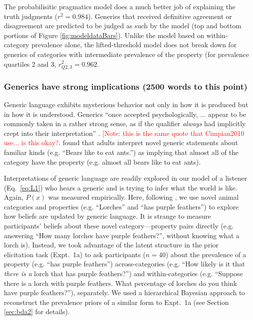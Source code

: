 \documentclass[10pt,letterpaper]{article}
\newcommand{\red}[1]{\textcolor{Red}{#1}}
\begin{document}
The probabilisitic pragmatics model does a much better job of explaining the truth judgments ($r^2=0.984$). 
Generics that received definitive agreement or disagreement are predicted to be judged as such by the model (top and bottom portions of Figure \ref{fig:modeldataBars}). Unlike the model based on within-category prevalence alone, the lifted-threshold model does not break down for generics of categories with intermediate prevalence of the property (for prevalence quartiles 2 and 3, $r_{Q2,3}^2=0.962$. 

\subsubsection{Generics have strong implications (2500 words to this point)} 

Generic language exhibits mysterious behavior not only in how it is produced but in how it is understood.
Generics ``once accepted psychologically, ... appear to be commonly taken in a rather strong sense, as if the qualifier \emph{always} had implicitly crept into their interpretation'' \cite{Abelson1966}. \red{[Note: this is the same quote that Cimpian2010 use... is this okay?}.
%
 found that adults interpret novel generic statements about familiar kinds (e.g. ``Bears like to eat ants.'') as implying that almost all of the category have the property (e.g. almost all bears like to eat ants).

Interpretations of generic language are readily explored in our model of a listener (Eq.~\ref{eq:L1}) who hears a generic and is trying to infer what the world is like. 
Again, $P(x)$ was measured empirically.
Here, following , we use novel animal categories and properties (e.g. ``Lorches'' and ``has purple feathers'') to explore how beliefs are updated by generic language. 
It is strange to measure participants' beliefs about these novel category---property pairs directly (e.g. answering ``How many lorches have purple feathers?'', without knowing what a lorch is).
Instead, we took advantage of the latent structure in the prior elicitation task (Expt.~1a) to ask participants ($n=40$) about the prevalence of a property (e.g. ``has purple feathers'') across-categories (e.g. ``How likely is it that \emph{there is a} lorch that has purple feathers?'') and within-categories (e.g. ``Suppose there is a lorch with purple feathers. What percentage of lorches do you think have purple feathers?''), separately. 
We used a hierarchical Bayesian approach to reconstruct the prevalence priors of a similar form to Expt.~1a (see Section \ref{sec:bda2} for details).
\end{document}
